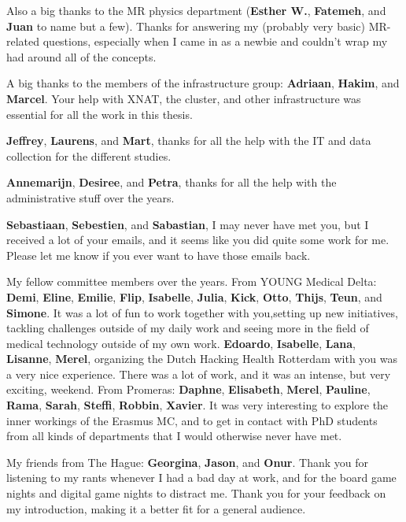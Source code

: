 Also a big thanks to the MR physics department (\textbf{Esther W.}, \textbf{Fatemeh}, and \textbf{Juan} to name but a few).
Thanks for answering my (probably very basic) MR-related questions, especially when I came in as a newbie and couldn't wrap my had around all of the concepts.

A big thanks to the members of the infrastructure group: \textbf{Adriaan}, \textbf{Hakim}, and \textbf{Marcel}.
Your help with XNAT, the cluster, and other infrastructure was essential for all the work in this thesis.

\textbf{Jeffrey}, \textbf{Laurens}, and \textbf{Mart}, thanks for all the help with the IT and data collection for the different studies.

\textbf{Annemarijn}, \textbf{Desiree}, and \textbf{Petra}, thanks for all the help with the administrative stuff over the years.

\textbf{Sebastiaan}, \textbf{Sebestien}, and \textbf{Sabastian}, I may never have met you, but I received a lot of your emails, and it seems like you did quite some work for me.
Please let me know if you ever want to have those emails back.


My fellow committee members over the years.
From YOUNG Medical Delta: \textbf{Demi}, \textbf{Eline}, \textbf{Emilie}, \textbf{Flip}, \textbf{Isabelle}, \textbf{Julia}, \textbf{Kick}, \textbf{Otto}, \textbf{Thijs}, \textbf{Teun}, and \textbf{Simone}.
It was a lot of fun to work together with you,setting up new initiatives, tackling challenges outside of my daily work and seeing more in the field of medical technology outside of my own work.
\textbf{Edoardo}, \textbf{Isabelle}, \textbf{Lana}, \textbf{Lisanne}, \textbf{Merel}, organizing the Dutch Hacking Health Rotterdam with you was a very nice experience.
There was a lot of work, and it was an intense, but very exciting, weekend.
From Promeras: \textbf{Daphne}, \textbf{Elisabeth}, \textbf{Merel}, \textbf{Pauline}, \textbf{Rama}, \textbf{Sarah}, \textbf{Steffi}, \textbf{Robbin}, \textbf{Xavier}.
It was very interesting to explore the inner workings of the Erasmus MC, and to get in contact with PhD students from all kinds of departments that I would otherwise never have met.


My friends from The Hague: \textbf{Georgina}, \textbf{Jason}, and \textbf{Onur}.
Thank you for listening to my rants whenever I had a bad day at work, and for the board game nights and digital game nights to distract me.
Thank you for your feedback on my introduction, making it a better fit for a general audience.

